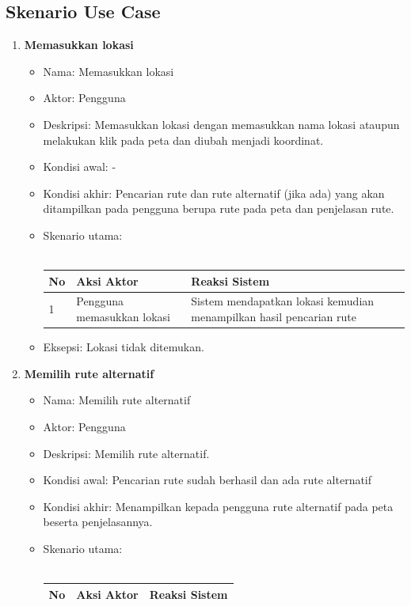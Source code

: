 \subsection{Skenario Use Case}
\begin{enumerate}
	\item \textbf{Memasukkan lokasi}
	\begin{itemize}
			\item Nama: Memasukkan lokasi
			\item Aktor: Pengguna
			\item Deskripsi: Memasukkan lokasi dengan memasukkan nama lokasi ataupun melakukan klik pada peta dan diubah menjadi koordinat.
			\item Kondisi awal: -
			\item Kondisi akhir: Pencarian rute dan rute alternatif (jika ada) yang akan ditampilkan pada pengguna berupa rute pada peta dan penjelasan rute.
			\item Skenario utama: \\ \\
				\begin{tabular}{|p{0.5cm} |p{6cm}| p{6cm}|}
						\hline
							No 	& Aksi Aktor & Reaksi Sistem \\ \hline
							1 	& Pengguna memasukkan lokasi 	&	Sistem mendapatkan lokasi kemudian menampilkan hasil pencarian rute \\ \hline 
						\end{tabular} 
			\item Eksepsi: Lokasi tidak ditemukan.
		\end{itemize}
	\item \textbf{Memilih rute alternatif}
	\begin{itemize}
			\item Nama: Memilih rute alternatif
			\item Aktor: Pengguna
			\item Deskripsi: Memilih rute alternatif.
			\item Kondisi awal: Pencarian rute sudah berhasil dan ada rute alternatif
			\item Kondisi akhir: Menampilkan kepada pengguna rute alternatif pada peta beserta penjelasannya.
			\item Skenario utama: \\ \\
				\begin{tabular}{|p{0.5cm} |p{6cm}| p{6cm}|}
						\hline
							No 	& Aksi Aktor & Reaksi Sistem \\ \hline

\end{tabular}
\end{itemize}
\end{enumerate}
